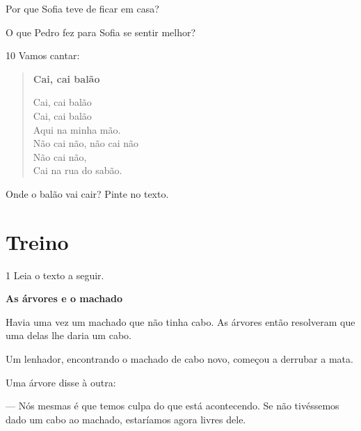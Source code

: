\begin{escolha}

\item{Por que Sofia teve de ficar em casa?}


\item{O que Pedro fez para Sofia se sentir melhor?}


\end{escolha}

\num{10} Vamos cantar:

\begin{myquote}
\begin{verse}
\textbf{Cai, cai balão}

Cai, cai balão\\
Cai, cai balão\\
Aqui na minha mão.\\
Não cai não, não cai não\\
Não cai não,\\
Cai na rua do sabão.
\end{verse}

\end{myquote}

Onde o balão vai cair? Pinte no texto.


\section*{Treino}

\num{1} Leia o texto a seguir.

\begin{myquote}
\textbf{As árvores e o machado}

Havia uma vez um machado que não tinha cabo.
As árvores então resolveram que uma delas lhe daria
um cabo.

Um lenhador, encontrando o machado de cabo novo,
começou a derrubar a mata.

Uma árvore disse à outra:

--- Nós mesmas é que temos culpa do que está
acontecendo. Se não tivéssemos dado um cabo ao machado,
estaríamos agora livres dele.

\end{myquote}

